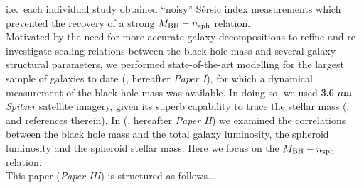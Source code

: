 \documentclass[preprint2]{emulateapj}
\begin{document}
i.e.~each individual study obtained ``noisy'' S\'ersic index measurements 
which prevented the recovery of a strong $M_{\rm BH} - n_{\rm sph}$ relation. \\
Motivated by the need for more accurate galaxy decompositions to refine and re-investigate scaling relations 
between the black hole mass and several galaxy structural parameters, 
we performed state-of-the-art modelling for the largest sample of galaxies to date (\citealt{paperI}, hereafter \emph{Paper I}),  
for which a dynamical measurement of the black hole mass was available.
In doing so, we used $3.6\rm~\mu m$ \emph{Spitzer} satellite imagery, 
given its superb capability to trace the stellar mass (\citealt{sheth2010}, and references therein). 
In \citeauthor{paperII} (\citeyear{paperII}, hereafter \emph{Paper II}) we examined the correlations between the black hole mass and 
the total galaxy luminosity, the spheroid luminosity and the spheroid stellar mass. 
Here we focus on the $M_{\rm BH} - n_{\rm sph}$ relation. \\
This paper (\emph{Paper III}) is structured as follows...
\end{document}
